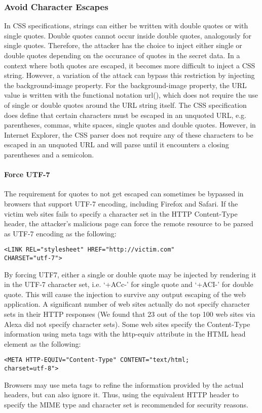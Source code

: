 \documentclass{acm_proc_article-sp}
\begin{document}
\subsubsection{Avoid Character Escapes}
In CSS specifications\cite{css}, strings can either be written with double quotes or with single quotes. Double quotes cannot occur inside double quotes, analogously for single quotes. Therefore, the attacker has the choice to inject either single or double quotes depending on the occurance of quotes in the secret data. In a context where both quotes are escaped, it becomes more difficult to inject a CSS string. However, a variation of the attack  can bypass this restriction by injecting the background-image property. For the background-image property, the URL value is written with the functional notation url(), which does not require the use of single or double quotes around the URL string itself. The CSS specification does define that certain characters must be escaped in an unquoted URL, e.g. parentheses, commas, white spaces, single quotes and double quotes. However, in Internet Explorer, the CSS parser does not require any of these characters to be escaped in an unquoted URL and will parse until it encounters a closing parentheses and a semicolon.

\paragraph{Force UTF-7}
The requirement for quotes to not get escaped can sometimes be bypassed in browsers that support UTF-7 encoding, including Firefox and Safari. If the victim web sites fails to specify a character set in the HTTP  Content-Type header, the attacker's malicious page can force the remote resource to be parsed as UTF-7 encoding as the following:
\begin{verbatim}
<LINK REL="stylesheet" HREF="http://victim.com" 
CHARSET="utf-7">
\end{verbatim}
By forcing UTF7, either a single or double quote may be injected by rendering it in the UTF-7 character set, i.e. `+ACc-' for single quote and `+ACI-' for double quote. This will cause the injection to survive any output escaping of the web application. A significant number of web sites actually do not specify character sets in their HTTP responses (We found that 23 out of the top 100 web sites via Alexa\cite{alexa} did not specify character sets). Some web sites specify the Content-Type information using meta tags with the http-equiv attribute in the HTML head element as the following:
\begin{verbatim}
<META HTTP-EQUIV="Content-Type" CONTENT="text/html; 
charset=utf-8">
\end{verbatim}
Browsers may use meta tags to refine the information provided by the actual headers, but can also ignore it. Thus, using the equivalent HTTP header to specify the MIME type and character set is recommended for security reasons.
\end{document}
